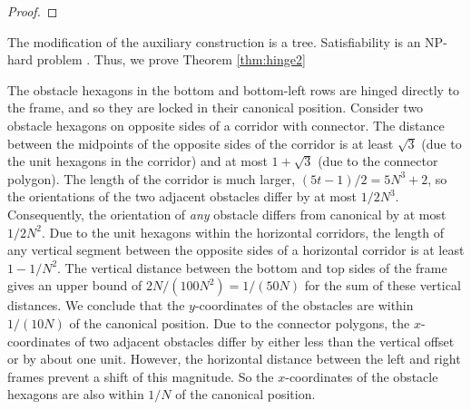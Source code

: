 \begin{proof}



\end{proof}
The modification of the auxiliary construction is a tree.  
Satisfiability is an NP-hard problem \cite{cook1971complexity}.
Thus, we prove Theorem \ref{thm:hinge2}

The obstacle hexagons in the bottom and bottom-left rows are hinged directly to the frame,
and so they are locked in their canonical position. Consider two obstacle hexagons on opposite
sides of a corridor with connector. The distance between the midpoints of the opposite sides of
the corridor is at least $\sqrt{3}$ (due to the unit hexagons in the corridor) and at most
$1+\sqrt{3}$ (due to the connector polygon). The length of the corridor is much larger,
$(5t-1)/2=5N^3+2$, so the orientations of the two adjacent obstacles differ by at most $1/2N^3$.
Consequently, the orientation of \emph{any} obstacle differs from canonical by at most $1/2N^2$.
Due to the unit hexagons within the horizontal corridors, the length of any vertical segment between
the opposite sides of a horizontal corridor is at least $1-1/N^2$. The vertical distance between the
bottom and top sides of the frame gives an upper bound of  $2N/(100N^2)=1/(50N)$ for the sum of these
vertical distances. We conclude that the $y$-coordinates of the obstacles are within $1/(10N)$
of the canonical position. Due to the connector polygons, the $x$-coordinates of
two adjacent obstacles differ by either less than the vertical offset or by about
one unit. However, the horizontal distance between the left and right frames prevent
a shift of this magnitude. So the $x$-coordinates of the obstacle hexagons are also
within $1/N$ of the canonical position.

